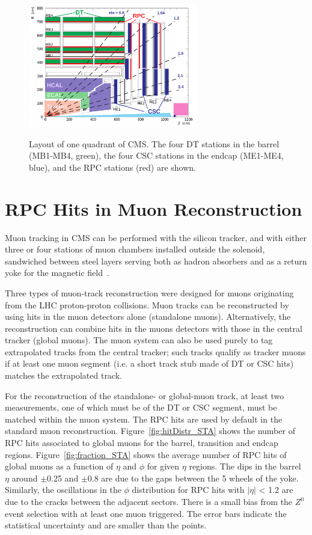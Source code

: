 \documentclass{JINST}
\begin{document}
\begin{figure}
  \begin{center}
    \texttt{\includegraphics[width=0.66\textwidth]{MuonSys-mod3}}
    \caption{
    Layout of one quadrant of CMS. The four DT stations in the barrel (MB1-MB4, green), the four CSC stations in the endcap (ME1-ME4, blue), and the RPC stations (red) are shown.
    }
    \label{fig:MuonSys}
    \vspace{-0.5cm}
  \end{center}
\end{figure}

\section{RPC Hits in Muon Reconstruction}
Muon tracking in CMS can be performed with the silicon tracker, and with either three or four stations of muon chambers installed outside the solenoid, sandwiched between steel layers serving both as hadron absorbers and as a return yoke for the magnetic field~\cite{PLB_chargeRatio}.

Three types of muon-track reconstruction were designed for muons originating from the LHC proton-proton collisions.
Muon tracks can be reconstructed by using hits in the muon detectors alone (standalone muons). Alternatively, the reconstruction can combine hits in the muons detectors with those in the central tracker (global muons). The muon system can also be used purely to tag extrapolated tracks from the central tracker; such tracks qualify as tracker muons if at least one muon segment (i.e. a short track stub made of DT or CSC hits) matches the extrapolated track.

For the reconstruction of the standalone- or global-muon track, at least two measurements, one of which must be of the DT or CSC segment, must be matched within the muon system.
The RPC hits are used by default in the standard muon reconstruction.
Figure~\ref{fig:hitDistr_STA} shows the number of RPC hits associated to global muons for the barrel, transition and endcap regions. 
Figure~\ref{fig:fraction_STA} shows the average number of RPC hits of global muons as a function of $\eta$ and $\phi$ for given $\eta$ regions.
The dips in the barrel $\eta$ around $\pm$0.25 and $\pm$0.8 are due to the gaps between the 5 wheels of the yoke.
Similarly, the oscillations in the $\phi$ distribution for RPC hits with $|\eta|$ < 1.2 are due to the cracks between the adjacent sectors.
There is a small bias from the $Z^{0}$ event selection with at least one muon triggered.
The error bars indicate the statistical uncertainty and are smaller than the points.
\end{document}
